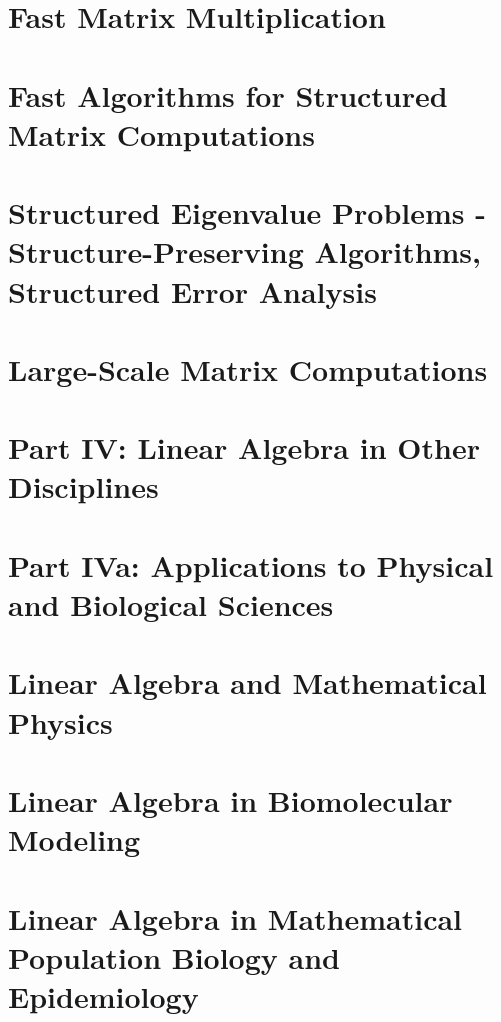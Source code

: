 \documentclass[a4paper]{article}
\begin{document}
\section{Fast Matrix Multiplication}

\section{Fast Algorithms for Structured Matrix Computations}

\section{Structured Eigenvalue Problems - Structure-Preserving Algorithms,
Structured Error Analysis}

\section{Large-Scale Matrix Computations}

\section*{Part IV: Linear Algebra in Other Disciplines}

\section*{Part IVa: Applications to Physical and Biological Sciences}

\section{Linear Algebra and Mathematical Physics}

\section{Linear Algebra in Biomolecular Modeling}

\section{Linear Algebra in Mathematical Population Biology and Epidemiology}
\end{document}

